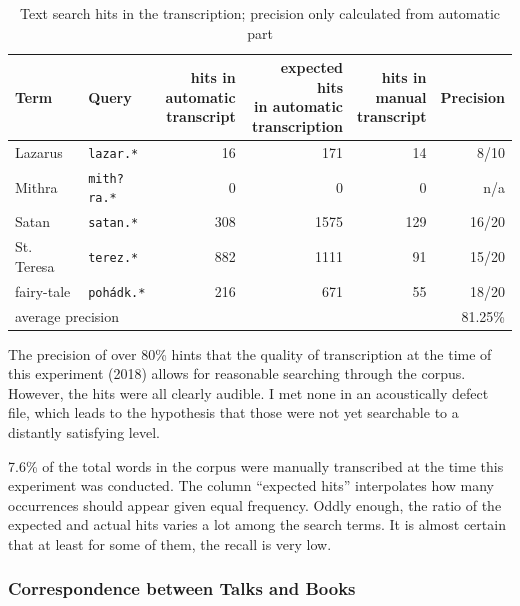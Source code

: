\documentclass[12pt,a4paper]{report}
\begin{document}
\begin{table}[htpb]
\begin{center}
\begin{tabular}{|l|l|r|r|r|r|}
\hline
Term &
Query &
\makecell{hits in\\automatic\\
transcript} &
\makecell{expected hits\\
in automatic\\
transcription} &
\makecell{hits in\\manual\\
transcript} &
Precision \\
\hline
Lazarus & \texttt{lazar.*} & 16 & 171 & 14 & 8/10   \\
Mithra & \texttt{mith?ra.*} & 0 & 0 & 0 & n/a   \\
Satan & \texttt{satan.*} & 308 & 1575 & 129 & 16/20   \\
St. Teresa & \texttt{terez.*} & 882 & 1111 & 91 & 15/20   \\
fairy-tale & \texttt{pohádk.*} & 216 & 671 & 55 & 18/20   \\
\hline
\multicolumn{5}{|l|}{average precision} & 81.25\%\\
\hline
\end{tabular}
\caption{Text search hits in the transcription; precision only calculated from
automatic part}\label{tab:topicsearch}
\end{center}
\end{table}

The precision of over 80\% hints that the
quality of transcription at the time of this experiment (2018) allows for reasonable searching through the corpus.
However, the hits were all clearly audible. I met none in an acoustically defect
file, which leads to the hypothesis that those were not yet searchable to a
distantly satisfying level.

7.6\% of the total words in the corpus were manually transcribed at the time
this experiment was conducted. The column
``expected hits'' interpolates how many occurrences should appear given equal
frequency. Oddly enough, the ratio of the expected and actual hits varies a lot
among the search terms. It is almost certain that at least for some of them, the
recall is very low.

\subsubsection{Correspondence between Talks and Books}
\end{document}
